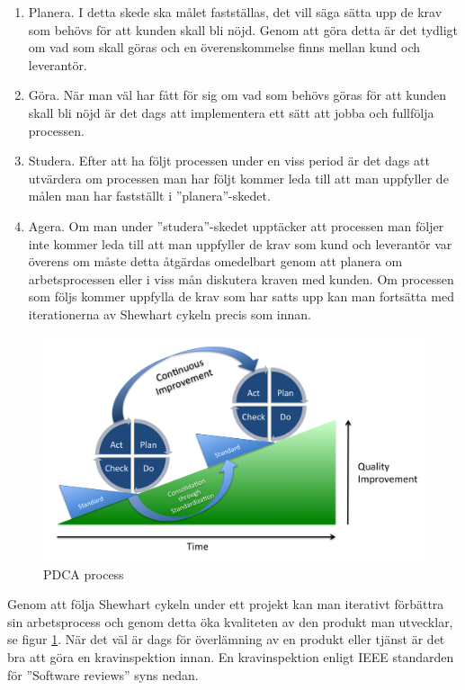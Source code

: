 \begin{enumerate}
  \item Planera. I detta skede ska målet fastställas, det vill säga sätta upp de krav som behövs för att kunden skall bli nöjd. Genom att göra detta är det tydligt om vad som skall göras och en överenskommelse finns mellan kund och leverantör. 
  \item Göra. När man väl har fått för sig om vad som behövs göras för att kunden skall bli nöjd är det dags att implementera ett sätt att jobba och fullfölja processen.
  \item Studera. Efter att ha följt processen under en viss period är det dags att utvärdera om processen man har följt kommer leda till att man uppfyller de målen man har fastställt i ''planera''-skedet.
  \item Agera. Om man under ''studera''-skedet upptäcker att processen man följer inte kommer leda till att man uppfyller de krav som kund och leverantör var överens om måste detta åtgärdas omedelbart genom att planera om arbetsprocessen eller i viss mån diskutera kraven med kunden. Om processen som följs kommer uppfylla de krav som har satts upp kan man fortsätta med iterationerna av Shewhart cykeln precis som innan.
\end{enumerate}
\begin{figure}[h]
\centerline{\includegraphics[scale=0.15]{ruben-tex/graphic/PDCA_Process}}
\caption{PDCA process}
\label{fig:pdcaprocess}
\end{figure}
\noindent Genom att följa Shewhart cykeln under ett projekt kan man iterativt förbättra sin arbetsprocess och genom detta öka kvaliteten av den produkt man utvecklar, se figur \ref{fig:pdcaprocess}.
\newline
\newline
När det väl är dags för överlämning av en produkt eller tjänst är det bra att göra en kravinspektion innan. En kravinspektion enligt IEEE standarden för ''Software reviews'' syns nedan.

